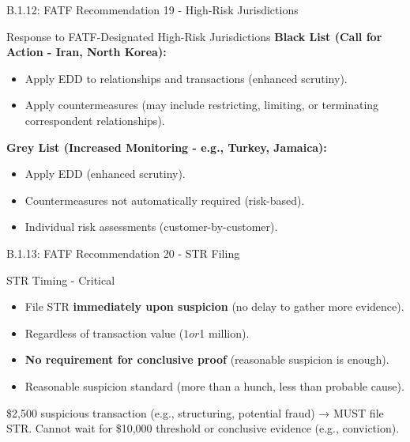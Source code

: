 \documentclass{beamer}
\begin{document}
	\begin{frame}{B.1.12: FATF Recommendation 19 - High-Risk Jurisdictions}
		\begin{block}{Response to FATF-Designated High-Risk Jurisdictions}
			\textbf{Black List (Call for Action - Iran, North Korea):}
			\begin{itemize}
				\item Apply EDD to relationships and transactions (enhanced scrutiny).
				\item Apply countermeasures (may include restricting, limiting, or terminating correspondent relationships).
			\end{itemize}
			\textbf{Grey List (Increased Monitoring - e.g., Turkey, Jamaica):}
			\begin{itemize}
				\item Apply EDD (enhanced scrutiny).
				\item Countermeasures not automatically required (risk-based).
				\item Individual risk assessments (customer-by-customer).
			\end{itemize}
		\end{block}
	\end{frame}
	
	\begin{frame}{B.1.13: FATF Recommendation 20 - STR Filing}
		\begin{block}{STR Timing - Critical}
			\begin{itemize}
				\item File STR \textbf{immediately upon suspicion} (no delay to gather more evidence).
				\item Regardless of transaction value ($1 or $1 million).
				\item \textbf{No requirement for conclusive proof} (reasonable suspicion is enough).
				\item Reasonable suspicion standard (more than a hunch, less than probable cause).
			\end{itemize}
		\end{block}
		\textcolor{red}{\textbf{}} \$2,500 suspicious transaction (e.g., structuring, potential fraud) → MUST file STR. Cannot wait for \$10,000 threshold or conclusive evidence (e.g., conviction).
	\end{frame}
	
\end{document}
